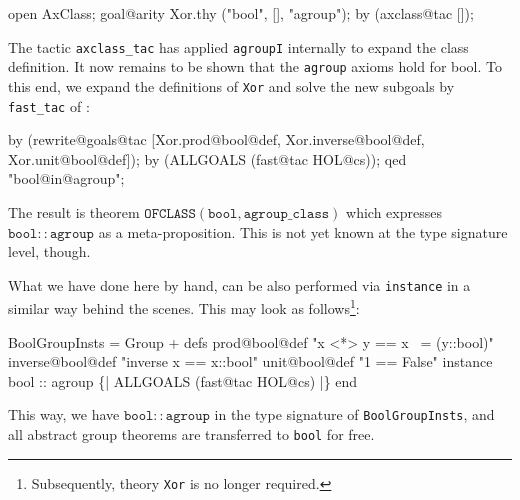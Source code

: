 \begin{ascbox}
\begin{ascbox}
\begin{ascbox}
open AxClass;
goal@arity Xor.thy ("bool", [], "agroup");
\brk
by (axclass@tac []);

The tactic \texttt{axclass_tac} has applied \texttt{agroupI} internally to
expand the class definition. It now remains to be shown that the
\texttt{agroup} axioms hold for bool. To this end, we expand the
definitions of \texttt{Xor} and solve the new subgoals by \texttt{fast_tac}
of \HOL:

\begin{ascbox}
by (rewrite@goals@tac [Xor.prod@bool@def, Xor.inverse@bool@def,
        Xor.unit@bool@def]);
by (ALLGOALS (fast@tac HOL@cs));
qed "bool@in@agroup";

The result is theorem $\texttt{OFCLASS}(\texttt{bool}, \texttt{agroup_class})$
which expresses $\texttt{bool} :: \texttt{agroup}$ as a meta-proposition. This
is not yet known at the type signature level, though.

\medskip

What we have done here by hand, can be also performed via
\texttt{instance} in a similar way behind the scenes. This may look as
follows\footnote{Subsequently, theory \texttt{Xor} is no longer
  required.}:

\begin{ascbox}
BoolGroupInsts = Group +\medskip
defs
  prod@bool@def     "x <*> y   == x ~= (y::bool)"
  inverse@bool@def  "inverse x == x::bool"
  unit@bool@def     "1         == False"\medskip
instance
  bool :: agroup                \{| ALLGOALS (fast@tac HOL@cs) |\}\medskip
end

This way, we have $\texttt{bool} :: \texttt{agroup}$ in the type signature of
\texttt{BoolGroupInsts}, and all abstract group theorems are transferred
to \texttt{bool} for free.


\end{ascbox}
\end{ascbox}
\end{ascbox}
\end{ascbox}
\end{ascbox}
